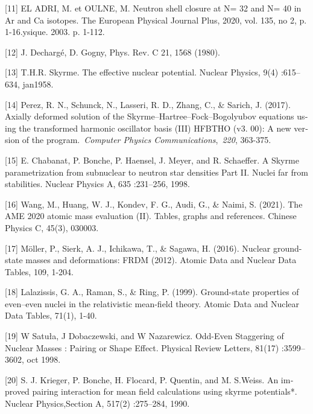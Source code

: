 \textenglish{[11] EL ADRI, M. et OULNE, M. Neutron shell closure at N= 32 and N= 40 in Ar and Ca isotopes. The European Physical Journal Plus, 2020, vol. 135, no 2, p. 1-16.ysique. 2003. p. 1-112.}

\textenglish{ [12] J. Dechargé, D. Gogny, Phys. Rev. C 21, 1568 (1980). }

\textenglish{[13] T.H.R. Skyrme. The effective nuclear potential. Nuclear Physics, 9(4) :615–634, jan1958.}

\textenglish{\textcolor[rgb]{0.13333334,0.13333334,0.13333334}{[14] Perez, R. N., Schunck, N., Lasseri, R. D., Zhang, C., \& Sarich, J. (2017). Axially deformed solution of the Skyrme–Hartree–Fock–Bogolyubov equations using the transformed harmonic oscillator basis (III) HFBTHO (v3. 00): A new version of the program.~}}\textenglish{\textit{\textcolor[rgb]{0.13333334,0.13333334,0.13333334}{Computer Physics Communications}}}\textenglish{\textcolor[rgb]{0.13333334,0.13333334,0.13333334}{,~}}\textenglish{\textit{\textcolor[rgb]{0.13333334,0.13333334,0.13333334}{220}}}\textenglish{\textcolor[rgb]{0.13333334,0.13333334,0.13333334}{, 363-375.}}

\textenglish{\textcolor[rgb]{0.13333334,0.13333334,0.13333334}{[15] E. Chabanat, P. Bonche, P. Haensel, J. Meyer, and R. Schaeffer. A Skyrme parametrization from subnuclear to neutron star densities Part II. Nuclei far from stabilities. Nuclear Physics A, 635 :231–256, 1998.}}

\textenglish{[16] Wang, M., Huang, W. J., Kondev, F. G., Audi, G., \& Naimi, S. (2021). The AME 2020 atomic mass evaluation (II). Tables, graphs and references. Chinese Physics C, 45(3), 030003.}

\textenglish{[17] Möller, P., Sierk, A. J., Ichikawa, T., \& Sagawa, H. (2016). Nuclear ground-state masses and deformations: FRDM (2012). Atomic Data and Nuclear Data Tables, 109, 1-204.}

\textenglish{[18] Lalazissis, G. A., Raman, S., \& Ring, P. (1999). Ground-state properties of even–even nuclei in the relativistic mean-field theory. Atomic Data and Nuclear Data Tables, 71(1), 1-40.}

\textenglish{[19] W Satuła, J Dobaczewski, and W Nazarewicz. Odd-Even Staggering of Nuclear Masses : Pairing or Shape Effect. Physical Review Letters, 81(17) :3599–3602, oct 1998.}

\textenglish{[20] S. J. Krieger, P. Bonche, H. Flocard, P. Quentin, and M. S.Weiss. An improved pairing interaction for mean field calculations using skyrme potentials*. Nuclear Physics,Section A, 517(2) :275–284, 1990.}
